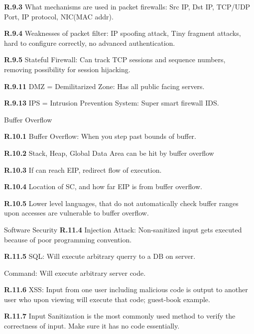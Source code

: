 \documentclass[8pt]{extreport}
\begin{document}
{\bf R.9.3}
What mechanisms are used in packet firewalls: Src IP, Dst IP, TCP/UDP Port, IP
protocol, NIC(MAC addr).


{\bf R.9.4}
Weaknesses of packet filter: IP spoofing attack, Tiny fragment attacks, hard to
configure correctly, no advanced authentication.


{\bf R.9.5}
Stateful Firewall: Can track TCP sessions and sequence numbers, removing
possibility for session hijacking.

{\bf R.9.11}
DMZ = Demilitarized Zone: Has all public facing servers.

{\bf R.9.13}
IPS = Intrusion Prevention System: Super smart firewall IDS.



{\Huge Buffer Overflow}

{\bf R.10.1}
Buffer Overflow: When you step past bounds of buffer. 

{\bf R.10.2}
Stack, Heap, Global Data Area can be hit by buffer overflow

{\bf R.10.3}
If can reach EIP, redirect flow of execution.

{\bf R.10.4}
Location of SC, and how far EIP is from buffer overflow.

{\bf R.10.5}
Lower level languages, that do not automatically check buffer ranges upon
accesses are vulnerable to buffer overflow.







{\Huge Software Security}
{\bf R.11.4}
Injection Attack: Non-sanitized input gets executed because of poor programming
convention.

{\bf R.11.5}
SQL: Will execute arbitrary querry to a DB on server.

Command: Will execute arbitrary server code.

{\bf R.11.6}
XSS: Input from one user including malicious code is output to another user who
upon viewing will execute that code; guest-book example.

{\bf R.11.7}
Input Sanitization is the most commonly used method to verify the correctness of
input. Make sure it has no code essentially.
\end{document}

